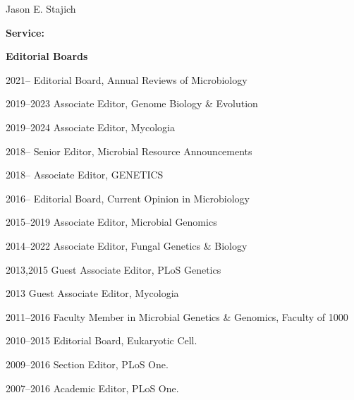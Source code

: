 \documentclass[10pt]{article}
\begin{document}
\begin{cv}{\centerline{Jason E. Stajich}}
\begin{cvlistcompact}{\bf Service:}
\item[{\bf Editorial Boards}]
\item [2021--] Editorial Board, Annual Reviews of Microbiology
\item [2019--2023] Associate Editor, Genome Biology \& Evolution
\item [2019--2024] Associate Editor, Mycologia
\item [2018--] Senior Editor, Microbial Resource Announcements
\item [2018--] Associate Editor, GENETICS
\item [2016--] Editorial Board, Current Opinion in Microbiology
\item [2015--2019] Associate Editor, Microbial Genomics
\item [2014--2022] Associate Editor, Fungal Genetics \& Biology
\item [2013,2015] Guest Associate Editor, PLoS Genetics
\item [2013] Guest Associate Editor, Mycologia
\item [2011--2016] Faculty Member in Microbial Genetics \& Genomics, Faculty of 1000
\item [2010--2015] Editorial Board, Eukaryotic Cell.
\item [2009--2016] Section Editor, PLoS One.
\item [2007--2016] Academic Editor, PLoS One.
\\


\end{cvlistcompact}
\end{cv}
\end{document}
